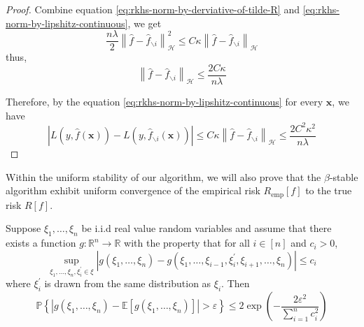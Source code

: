 \documentclass[a4paper, 12pt, mtpro2, authoryear]{elegantpaper}
\begin{document}
\begin{proof}
    Combine equation \eqref{eq:rkhs-norm-by-derviative-of-tilde-R} and \eqref{eq:rkhs-norm-by-lipshitz-continuous}, we get
    \begin{equation}
        \frac{n\lambda}{2}\left\|\hat{f}-\hat{f}_{\backslash i}\right\|_{\mathcal{H}}^{2}\leq C\kappa\left\|\hat{f}-\hat{f}_{\backslash i}\right\|_{\mathcal{H}}
    \end{equation}
    thus,
    \begin{equation}
        \left\|\hat{f}-\hat{f}_{\backslash i}\right\|_{\mathcal{H}}\leq\frac{2C\kappa}{n\lambda}
    \end{equation}

    Therefore, by the equation \eqref{eq:rkhs-norm-by-lipshitz-continuous} for every $\mathbf{x}$, we have
    \begin{equation}
        \left|L\left(y,\hat{f}(\mathbf{x})\right)-L\left(y,\hat{f}_{\backslash i}(\mathbf{x})\right)\right|\leq C\kappa\left\|\hat{f}-\hat{f}_{\backslash i}\right\|_{\mathcal{H}}\leq\frac{2C^{2}\kappa^{2}}{n\lambda}
    \end{equation}
\end{proof}

Within the uniform stability of our algorithm, we will also prove that the $\beta$-stable algorithm exhibit uniform convergence of the empirical risk $R_{\text{emp}}[f]$ to the true risk $R[f]$.

\begin{theorem}
    \label{thm:McDiarmid-bound}
    Suppose $\xi_{1},\ldots,\xi_{n}$ be i.i.d real value random variables and assume that there exists a function $g:\mathbb{R}^{n}\rightarrow\mathbb{R}$ with the property that for all $i\in[n]$ and $c_{i}>0$,
    \begin{equation}
        \sup_{\xi_{1},\ldots,\xi_{n},\xi_{i}^{\prime}\in\xi}\left|g\left(\xi_{1},\ldots,\xi_{n}\right)-g\left(\xi_{1},\ldots,\xi_{i-1},\xi_{i}^{\prime},\xi_{i+1},\ldots,\xi_{n}\right)\right|\leq c_{i}
    \end{equation}
    where $\xi_{i}^{\prime}$ is drawn from the same distribution as $\xi_{i}$. Then
    \begin{equation}
        \mathbb{P}\left\{\left|g\left(\xi_{1},\ldots,\xi_{n}\right)-\mathbb{E}\left[g\left(\xi_{1},\ldots,\xi_{n}\right)\right]\right|>\varepsilon\right\}\leq 2\exp\left(-\frac{2\varepsilon^{2}}{\sum_{i=1}^{n}c_{i}^{2}}\right)
    \end{equation}
\end{theorem}
\end{document}
